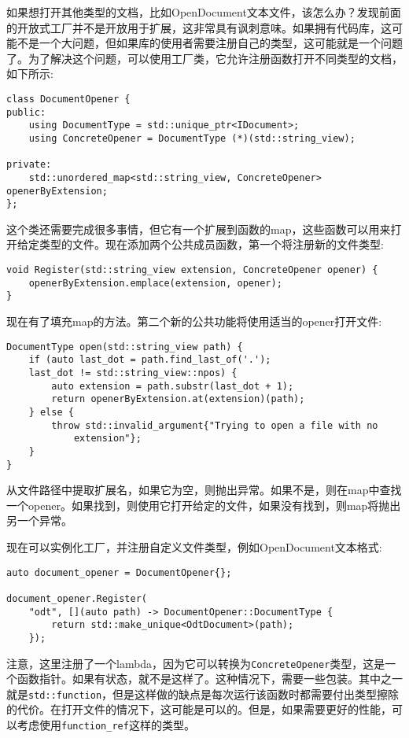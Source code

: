 如果想打开其他类型的文档，比如OpenDocument文本文件，该怎么办？发现前面的开放式工厂并不是开放用于扩展，这非常具有讽刺意味。如果拥有代码库，这可能不是一个大问题，但如果库的使用者需要注册自己的类型，这可能就是一个问题了。为了解决这个问题，可以使用工厂类，它允许注册函数打开不同类型的文档，如下所示:

\begin{lstlisting}[style=styleCXX]
class DocumentOpener {
public:
	using DocumentType = std::unique_ptr<IDocument>;
	using ConcreteOpener = DocumentType (*)(std::string_view);

private:
	std::unordered_map<std::string_view, ConcreteOpener> openerByExtension;
};
\end{lstlisting}

这个类还需要完成很多事情，但它有一个扩展到函数的map，这些函数可以用来打开给定类型的文件。现在添加两个公共成员函数，第一个将注册新的文件类型:

\begin{lstlisting}[style=styleCXX]
void Register(std::string_view extension, ConcreteOpener opener) {
	openerByExtension.emplace(extension, opener);
}
\end{lstlisting}

现在有了填充map的方法。第二个新的公共功能将使用适当的opener打开文件:

\begin{lstlisting}[style=styleCXX]
DocumentType open(std::string_view path) {
	if (auto last_dot = path.find_last_of('.');
	last_dot != std::string_view::npos) {
		auto extension = path.substr(last_dot + 1);
		return openerByExtension.at(extension)(path);
	} else {
		throw std::invalid_argument{"Trying to open a file with no
			extension"};
	}
}
\end{lstlisting}

从文件路径中提取扩展名，如果它为空，则抛出异常。如果不是，则在map中查找一个opener。如果找到，则使用它打开给定的文件，如果没有找到，则map将抛出另一个异常。

现在可以实例化工厂，并注册自定义文件类型，例如OpenDocument文本格式:

\begin{lstlisting}[style=styleCXX]
auto document_opener = DocumentOpener{};

document_opener.Register(
	"odt", [](auto path) -> DocumentOpener::DocumentType {
		return std::make_unique<OdtDocument>(path);
	});
\end{lstlisting}

注意，这里注册了一个lambda，因为它可以转换为\texttt{ConcreteOpener}类型，这是一个函数指针。如果有状态，就不是这样了。这种情况下，需要一些包装。其中之一就是\texttt{std::function}，但是这样做的缺点是每次运行该函数时都需要付出类型擦除的代价。在打开文件的情况下，这可能是可以的。但是，如果需要更好的性能，可以考虑使用\texttt{function\_ref}这样的类型。

